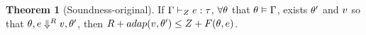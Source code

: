 \documentclass[a4paper,11pt]{article}
\theoremstyle{definition}
\newtheorem{thm}{Theorem}
\begin{document}

  




\begin{thm}[Soundness-original]
\label{soundness}
If $\Gamma \vdash_{Z} e : \tau$, $ \forall \theta$ that $\theta
\vDash \Gamma$, exists $\theta'$ and $v$ so that $\theta , e \mathrel{\Downarrow^{R}} v,
\theta'  $, then  $ R + adap(v, \theta')  \leq  Z + F(\theta, e)$.  
\end{thm}


                                       
\end{document}
